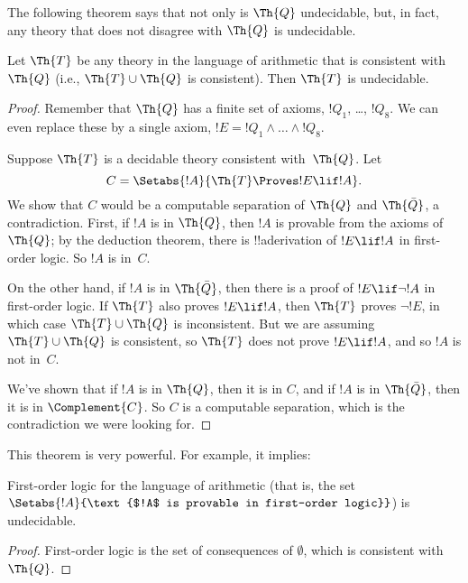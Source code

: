 \documentclass[../../../include/open-logic-section]{subfiles}
\begin{document}

The following theorem says that not only is $\Th{Q}$ undecidable, but, in
fact, any theory that does not disagree with $\Th{Q}$ is undecidable.

\begin{thm}
Let $\Th{T}$ be any theory in the language of arithmetic that is
consistent with $\Th{Q}$ (i.e., $\Th{T} \cup \Th{Q}$ is
consistent). Then $\Th{T}$ is undecidable.
\end{thm}

\begin{proof}
Remember that $\Th{Q}$ has a finite set of axioms, $!Q_1$, \dots,
$!Q_8$. We can even replace these by a single axiom, $!E = !Q_1 \land
\dots \land !Q_8$.

Suppose $\Th{T}$ is a decidable theory consistent with~$\Th{Q}$. Let
\[
C = \Setabs{!A}{\Th{T} \Proves !E \lif !A}.
\]
We show that $C$ would be a computable separation of $\Th{Q}$ and
$\Th{\bar Q}$, a contradiction. First, if $!A$ is in $\Th{Q}$, then
$!A$ is provable from the axioms of $\Th{Q}$; by the deduction
theorem, there is !!a{derivation} of $!E \lif !A$ in first-order logic. So
$!A$ is in~$C$.

On the other hand, if $!A$ is in $\Th{\bar Q}$, then there is a proof
of $!E \lif \lnot !A$ in first-order logic. If $\Th{T}$ also proves
$!E \lif !A$, then $\Th{T}$ proves $\lnot !E$, in which case $\Th{T}
\cup \Th{Q}$ is inconsistent. But we are assuming $\Th{T} \cup \Th{Q}$
is consistent, so $\Th{T}$ does not prove $!E \lif !A$, and so $!A$
is not in~$C$.

We've shown that if $!A$ is in $\Th{Q}$, then it is in $C$, and if
$!A$ is in $\Th{\bar Q}$, then it is in $\Complement{C}$. So $C$ is a
computable separation, which is the contradiction we were looking for.
\end{proof}

This theorem is very powerful. For example, it implies:

\begin{cor}
  First-order logic for the language of arithmetic (that is, the set
  $\Setabs{!A}{\text{$!A$ is provable in first-order logic}}$) is
  undecidable.
\end{cor}

\begin{proof}
First-order logic is the set of consequences of $\emptyset$,
which is consistent with~$\Th{Q}$.
\end{proof}
\end{document}
